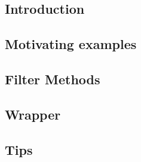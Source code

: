 
\subsection{Introduction}


\subsection{Motivating examples}


\subsection{Filter Methods}

%

%

\subsection{Wrapper}


%

\subsection{Tips}



